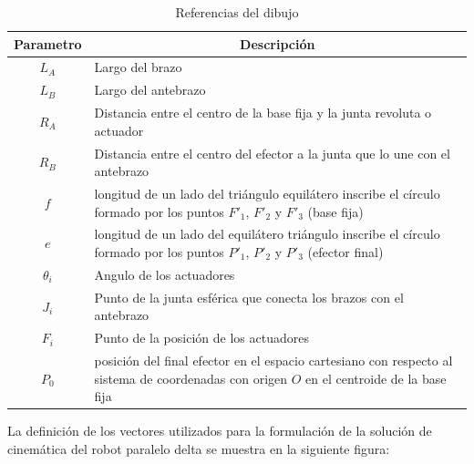         \begingroup
            \renewcommand{\arraystretch}{1.3}
            \begin{table}[H]
            \centering
            \begin{tabular}{c m{12cm}}
               \hline
               \textbf{Parametro}  & \multicolumn{1}{c}{\textbf{Descripción}}  \\
               \hline           \hline            
             $L_A$ & Largo del brazo \\
            \hline
             $L_B$ & Largo del antebrazo \\
            \hline
             $R_A$ & Distancia entre el centro de la base fija y la junta revoluta o actuador \\
            \hline
             $R_B$ & Distancia entre el centro del efector a la junta que lo une con el antebrazo\\
            \hline
             $f$ & longitud de un lado del triángulo equilátero inscribe el círculo formado por los puntos $F'_1$, $F'_2$ y $F'_3$ (base fija)\\
            \hline
             $e$ & longitud de un lado del equilátero triángulo inscribe el círculo formado por los puntos $P'_1$, $P'_2$ y $P'_3$ (efector final)\\
            \hline
             $\theta_i$ & Angulo de los actuadores\\
            \hline
             $J_i$ & Punto de la junta esférica que conecta los brazos con el antebrazo\\
            \hline            
             $F_i$ & Punto de la posición de los actuadores\\
            \hline  
             $P_0$ & posición del final efector en el espacio cartesiano con respecto al sistema de coordenadas con origen $O$ en el centroide de la base fija\\
            \hline            
            \end{tabular}
            \caption{Referencias del dibujo}
           \label{tab:cap4_tabla_12}
        \end{table}
        \endgroup     
        
        
        \newpage
    
        La definición de los vectores utilizados para la formulación de la solución de cinemática del robot paralelo delta se muestra en la siguiente figura: 
    
